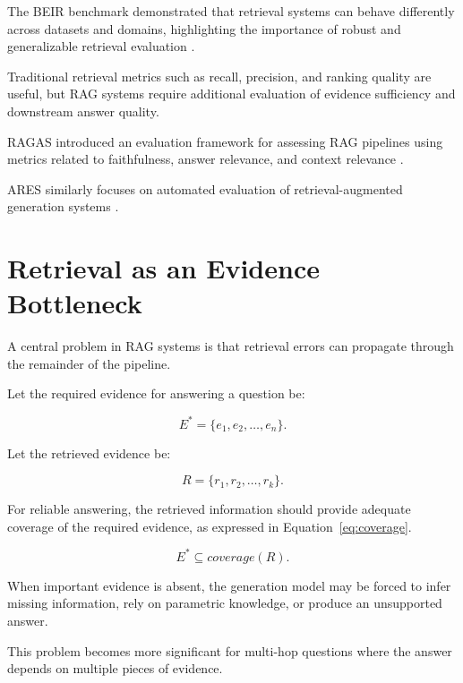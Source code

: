\documentclass[12pt,a4paper]{article}
\begin{document}
The BEIR benchmark demonstrated that retrieval systems can behave
differently across datasets and domains, highlighting the importance of
robust and generalizable retrieval evaluation
\cite{thakur2021beir}.

Traditional retrieval metrics such as recall, precision, and ranking
quality are useful, but RAG systems require additional evaluation of
evidence sufficiency and downstream answer quality.

RAGAS introduced an evaluation framework for assessing RAG pipelines using
metrics related to faithfulness, answer relevance, and context relevance
\cite{es2024ragas}.

ARES similarly focuses on automated evaluation of retrieval-augmented
generation systems \cite{saadfalcon2024ares}.

\section{Retrieval as an Evidence Bottleneck}
\label{sec:bottleneck}

A central problem in RAG systems is that retrieval errors can propagate
through the remainder of the pipeline.

Let the required evidence for answering a question be:

\begin{equation}
E^{*} = \{e_1,e_2,\ldots,e_n\}.
\label{eq:required-evidence}
\end{equation}

Let the retrieved evidence be:

\begin{equation}
R = \{r_1,r_2,\ldots,r_k\}.
\label{eq:retrieved-evidence}
\end{equation}

For reliable answering, the retrieved information should provide adequate
coverage of the required evidence, as expressed in
Equation~\ref{eq:coverage}.

\begin{equation}
E^{*} \subseteq coverage(R).
\label{eq:coverage}
\end{equation}

When important evidence is absent, the generation model may be forced to
infer missing information, rely on parametric knowledge, or produce an
unsupported answer.

This problem becomes more significant for multi-hop questions where the
answer depends on multiple pieces of evidence.
\end{document}
